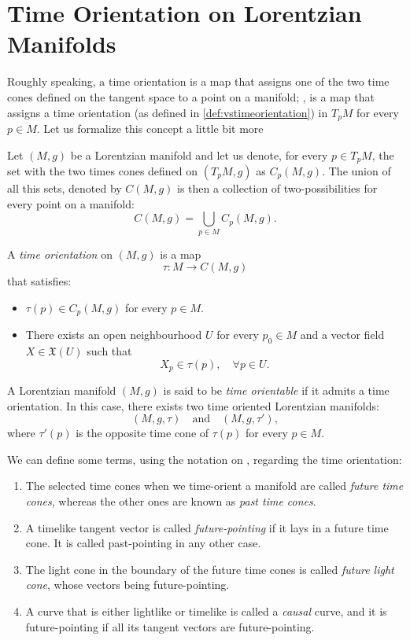 \section{Time Orientation on Lorentzian Manifolds}

Roughly speaking, a time orientation is a map that assigns one of the two time cones defined on the tangent space to a point on a manifold; \ie, is a map that assigns a time orientation (as defined in \autoref{def:vstimeorientation}) in $T_pM$ for every $p \in M$. Let us formalize this concept a little bit more

Let $(M,g)$ be a Lorentzian manifold and let us denote, for every $p \in T_pM$, the set with the two times cones defined on $(T_p M, g)$ as $C_p(M,g)$. The union of all this sets, denoted by $C(M,g)$ is then a collection of two-possibilities for every point on a manifold:
\[
C(M,g) = \bigcup_{p \in M} C_p(M,g).
\]

\begin{definition}
	A \emph{time orientation} on $(M,g)$ is a map
	\[
	\tau \colon M \to C(M,g)
	\]
	that satisfies:
	\begin{itemize}
		\item $\tau(p) \in C_p(M,g)$ for every $p \in M$.
		\item There exists an open neighbourhood $U$ for every $p_0 \in M$ and a vector field $X \in \mathfrak{X}(U)$ such that
		\[
		X_p \in \tau(p), \quad \forall p \in U.
		\]
	\end{itemize}
	
	A Lorentzian manifold $(M,g)$ is said to be \emph{time orientable} if it admits a time orientation. In this case, there exists two time oriented Lorentzian manifolds:
	\[
	(M,g,\tau) \quad\textrm{and}\quad (M,g,\tau'),
	\]
	where $\tau'(p)$ is the opposite time cone of $\tau(p)$ for every $p\in M$.
\end{definition}

We can define some terms, using the notation on \cite[p. 33]{oneill95}, regarding the time orientation:
\begin{enumerate}
	\item The selected time cones when we time-orient a manifold are called \emph{future time cones}, whereas the other ones are known as \emph{past time cones}.
	\item A timelike tangent vector is called \emph{future-pointing} if it lays in a future time cone. It is called past-pointing in any other case.
	\item The light cone in the boundary of the future time cones is called \emph{future light cone}, whose vectors being future-pointing.
	\item A curve that is either lightlike or timelike is called a \emph{causal} curve, and it is future-pointing if all its tangent vectors are future-pointing.
\end{enumerate}

